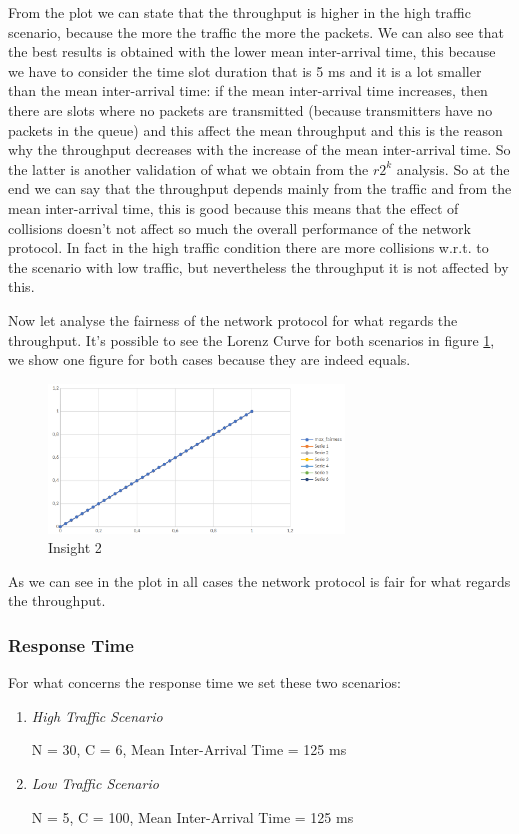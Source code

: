 \noindent From the plot we can state that the throughput is higher in the high traffic scenario, because the more the traffic the more the packets. We can also see that the best results is obtained with the lower mean inter-arrival time, this because we have to consider the time slot duration that is 5 ms and it is a lot smaller than the mean inter-arrival time: if the mean inter-arrival time increases, then there are slots where no packets are transmitted (because transmitters have no packets in the queue) and this affect the mean throughput and this is the reason why the throughput decreases with the increase of the mean inter-arrival time. So the latter is another validation of what we obtain from the $r2^k$ analysis. So at the end we can say that the throughput depends mainly from the traffic and from the mean inter-arrival time, this is good because this means that the effect of collisions doesn't not affect so much the overall performance of the network protocol. In fact in the high traffic condition there are more collisions w.r.t. to the scenario with low traffic, but nevertheless the throughput it is not affected by this.

\noindent Now let analyse the fairness of the network protocol for what regards the throughput. It's possible to see the Lorenz Curve for both scenarios in figure \ref{img: insight2_throughput}, we show one figure for both cases because they are indeed equals.

\begin{figure}[H]
	\centering
	\includegraphics[width=0.7\textwidth]{img/lorenz_throughput.png}
	\caption{Insight 2}
	\label{img: insight2_throughput}
\end{figure}

\noindent As we can see in the plot in all cases the network protocol is fair for what regards the throughput.

\subsubsection{Response Time}
For what concerns the response time we set these two scenarios:
\begin{enumerate}
	\item \textit{High Traffic Scenario}
	
	N = 30, C = 6, Mean Inter-Arrival Time = 125 ms
	\item \textit{Low Traffic Scenario}
	
	N = 5, C = 100, Mean Inter-Arrival Time = 125 ms
\end{enumerate}


